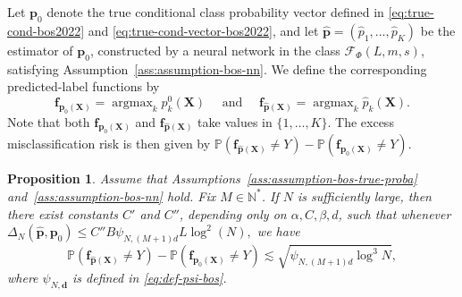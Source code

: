 \documentclass{article}
\theoremstyle{plain}
\newtheorem{proposition}[theorem]{Proposition}
\theoremstyle{definition}
\theoremstyle{remark}
\newcommand{\PP}{\mathbb{P}}
\DeclareMathOperator*{\argmax}{argmax}
\begin{document}
Let \(\mathbf{p}_0\) denote the true conditional class probability vector defined in
\eqref{eq:true-cond-bos2022} and \eqref{eq:true-cond-vector-bos2022}, and let
\(\widehat{\mathbf{p}}=(\widehat p_1, ..., \widehat p_K)\) be the estimator of
\(\mathbf{p}_0\), constructed by a neural network in the class
\(\mathcal{F}_\Phi(L,m,s)\), satisfying Assumption~\ref{ass:assumption-bos-nn}.  We define the corresponding predicted-label functions by
\[
\mathbf{f}_{\mathbf{p}_0(\mathbf{X})}= \argmax_k p_k^0(\mathbf{X}) \quad \text{ and }\quad \mathbf{f}_{\widehat{\mathbf{p}}(\mathbf{X})}= \argmax_k \widehat{p}_k(\mathbf{X}). 
\]
Note that both \(\mathbf{f}_{\mathbf{p}_0(\mathbf{X})}\) and
\(\mathbf{f}_{\widehat{\mathbf{p}}(\mathbf{X})}\) take values in
\(\{1,\ldots,K\}\). The excess misclassification risk is then given by
$
  \PP (\mathbf{f}_{\widehat{\mathbf{p}}(\mathbf{X})}\neq Y)-   \PP (\mathbf{f}_{\mathbf{p}_0(\mathbf{X})}\neq Y). 
$
\begin{proposition}\label{prop:excess-risk-bos2022}
Assume that Assumptions~\ref{ass:assumption-bos-true-proba} and~\ref{ass:assumption-bos-nn} hold. Fix $M\in\mathbb{N}^*$. 
If $N$ is sufficiently large, then there exist constants $C'$ and $C''$, depending only on $\alpha,C,\beta,d$, such that whenever
$\Delta_N(\widehat{\mathbf{p}},\mathbf{p}_0)
\leq C'' B\psi_{N,(M+1)d} L\log^2(N),
$
we have
\begin{equation}
   \PP (\mathbf{f}_{\widehat{\mathbf{p}}(\mathbf{X})}\neq Y)-   \PP (\mathbf{f}_{\mathbf{p}_0(\mathbf{X})}\neq Y)\lesssim \sqrt{\psi_{N,(M+1)d}\log^3N},
\end{equation}
where $\psi_{N, \mathbf{d}}$ is defined in \eqref{eq:def-psi-bos}.
\end{proposition}
\end{document}
